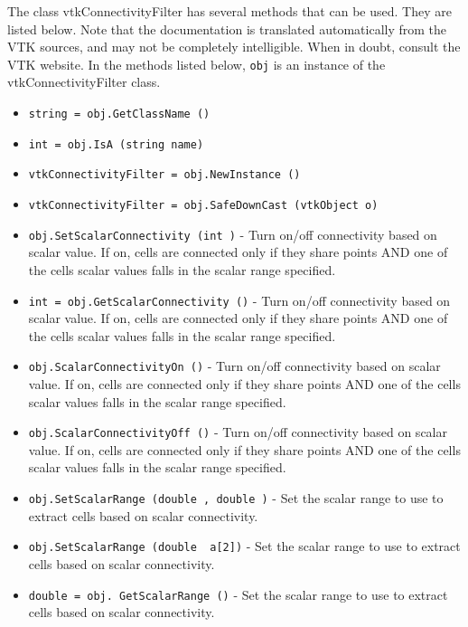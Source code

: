 The class vtkConnectivityFilter has several methods that can be used.
  They are listed below.
Note that the documentation is translated automatically from the VTK sources,
and may not be completely intelligible.  When in doubt, consult the VTK website.
In the methods listed below, \verb|obj| is an instance of the vtkConnectivityFilter class.
\begin{itemize}
\item  \verb|string = obj.GetClassName ()|

\item  \verb|int = obj.IsA (string name)|

\item  \verb|vtkConnectivityFilter = obj.NewInstance ()|

\item  \verb|vtkConnectivityFilter = obj.SafeDownCast (vtkObject o)|

\item  \verb|obj.SetScalarConnectivity (int )| -  Turn on/off connectivity based on scalar value. If on, cells are connected
 only if they share points AND one of the cells scalar values falls in the
 scalar range specified.

\item  \verb|int = obj.GetScalarConnectivity ()| -  Turn on/off connectivity based on scalar value. If on, cells are connected
 only if they share points AND one of the cells scalar values falls in the
 scalar range specified.

\item  \verb|obj.ScalarConnectivityOn ()| -  Turn on/off connectivity based on scalar value. If on, cells are connected
 only if they share points AND one of the cells scalar values falls in the
 scalar range specified.

\item  \verb|obj.ScalarConnectivityOff ()| -  Turn on/off connectivity based on scalar value. If on, cells are connected
 only if they share points AND one of the cells scalar values falls in the
 scalar range specified.

\item  \verb|obj.SetScalarRange (double , double )| -  Set the scalar range to use to extract cells based on scalar connectivity.

\item  \verb|obj.SetScalarRange (double  a[2])| -  Set the scalar range to use to extract cells based on scalar connectivity.

\item  \verb|double = obj. GetScalarRange ()| -  Set the scalar range to use to extract cells based on scalar connectivity.


\end{itemize}

